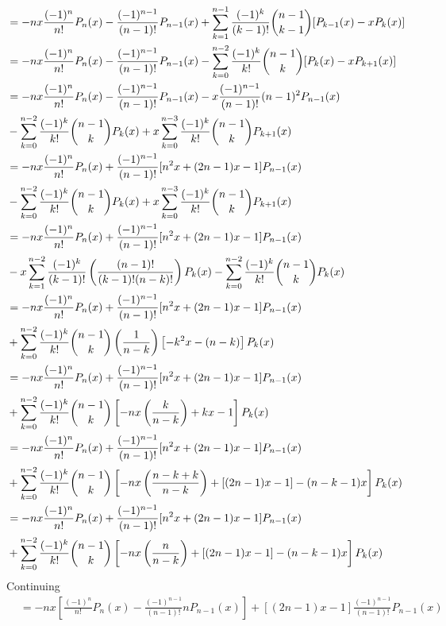 \begin{solution}
\begin{align*}
 & =-nx\frac{(-1)^{n}}{n!}P_{n}(x)-\frac{(-1)^{n-1}}{(n-1)!}P_{n-1}(x)+\sum_{k=1}^{n-1}\frac{(-1)^{k}}{(k-1)!}\dbinom{n-1}{k-1}[P_{k-1}(x)-xP_{k}(x)]\\
 & =-nx\frac{(-1)^{n}}{n!}P_{n}(x)-\frac{(-1)^{n-1}}{(n-1)!}P_{n-1}(x)-\sum_{k=0}^{n-2}\frac{(-1)^{k}}{k!}\dbinom{n-1}{k}[P_{k}(x)-xP_{k+1}(x)]\\
 & =-nx\frac{(-1)^{n}}{n!}P_{n}(x)-\frac{(-1)^{n-1}}{(n-1)!}P_{n-1}(x)-x\frac{(-1)^{n-1}}{(n-1)!}(n-1)^{2}P_{n-1}(x)\\
 & -\sum_{k=0}^{n-2}\frac{(-1)^{k}}{k!}\dbinom{n-1}{k}P_{k}(x)+x\sum_{k=0}^{n-3}\frac{(-1)^{k}}{k!}\dbinom{n-1}{k}P_{k+1}(x)\\
 & =-nx\frac{(-1)^{n}}{n!}P_{n}(x)+\frac{(-1)^{n-1}}{(n-1)!}[n^{2}x+(2n-1)x-1]P_{n-1}(x)\\
 & -\sum_{k=0}^{n-2}\frac{(-1)^{k}}{k!}\dbinom{n-1}{k}P_{k}(x)+x\sum_{k=0}^{n-3}\frac{(-1)^{k}}{k!}\dbinom{n-1}{k}P_{k+1}(x)\\
 & =-nx\frac{(-1)^{n}}{n!}P_{n}(x)+\frac{(-1)^{n-1}}{(n-1)!}[n^{2}x+(2n-1)x-1]P_{n-1}(x)\\
 & -x\sum_{k=1}^{n-2}\frac{(-1)^{k}}{(k-1)!}\left(\frac{(n-1)!}{(k-1)!(n-k)!}\right)P_{k}(x)-\sum_{k=0}^{n-2}\frac{(-1)^{k}}{k!}\dbinom{n-1}{k}P_{k}(x)\\
 & =-nx\frac{(-1)^{n}}{n!}P_{n}(x)+\frac{(-1)^{n-1}}{(n-1)!}[n^{2}x+(2n-1)x-1]P_{n-1}(x)\\
 & +\sum_{k=0}^{n-2}\frac{(-1)^{k}}{k!}\dbinom{n-1}{k}\left(\frac{1}{n-k}\right)\left[-k^{2}x-(n-k)\right]P_{k}(x)\\
 & =-nx\frac{(-1)^{n}}{n!}P_{n}(x)+\frac{(-1)^{n-1}}{(n-1)!}[n^{2}x+(2n-1)x-1]P_{n-1}(x)\\
 & +\sum_{k=0}^{n-2}\frac{(-1)^{k}}{k!}\dbinom{n-1}{k}\left[-nx\left(\frac{k}{n-k}\right)+kx-1\right]P_{k}(x)\\
 & =-nx\frac{(-1)^{n}}{n!}P_{n}(x)+\frac{(-1)^{n-1}}{(n-1)!}[n^{2}x+(2n-1)x-1]P_{n-1}(x)\\
 & +\sum_{k=0}^{n-2}\frac{(-1)^{k}}{k!}\dbinom{n-1}{k}\left[-nx\left(\frac{n-k+k}{n-k}\right)+[(2n-1)x-1]-(n-k-1)x\right]P_{k}(x)\\
 & =-nx\frac{(-1)^{n}}{n!}P_{n}(x)+\frac{(-1)^{n-1}}{(n-1)!}[n^{2}x+(2n-1)x-1]P_{n-1}(x)\\
 & +\sum_{k=0}^{n-2}\frac{(-1)^{k}}{k!}\dbinom{n-1}{k}\left[-nx\left(\frac{n}{n-k}\right)+[(2n-1)x-1]-(n-k-1)x\right]P_{k}(x)
\end{align*}
Continuing 
\begin{align*}
 & =-nx\left[\frac{(-1)^{n}}{n!}P_{n}(x)-\frac{(-1)^{n-1}}{(n-1)!}nP_{n-1}(x)\right]+[(2n-1)x-1]\frac{(-1)^{n-1}}{(n-1)!}P_{n-1}(x)\\

\end{align*}
\end{solution}
